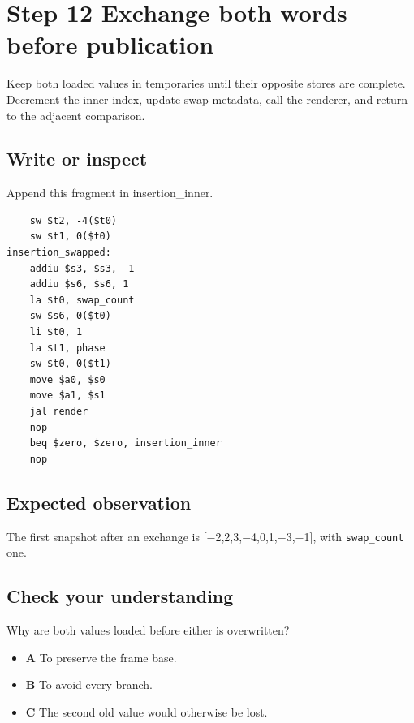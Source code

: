 \section{Step 12 Exchange both words before
  publication}\label{009-sorting-visualizer-s12-step-12-exchange-both-words-before-publication}

Keep both loaded values in temporaries until their opposite stores are
complete. Decrement the inner index, update swap metadata, call the
renderer, and return to the adjacent comparison.

\subsection{Write or
  inspect}\label{009-sorting-visualizer-s12-write-or-inspect}

Append this fragment in insertion\_inner.

\begin{verbatim}
    sw $t2, -4($t0)
    sw $t1, 0($t0)
insertion_swapped:
    addiu $s3, $s3, -1
    addiu $s6, $s6, 1
    la $t0, swap_count
    sw $s6, 0($t0)
    li $t0, 1
    la $t1, phase
    sw $t0, 0($t1)
    move $a0, $s0
    move $a1, $s1
    jal render
    nop
    beq $zero, $zero, insertion_inner
    nop
\end{verbatim}

\subsection{Expected
  observation}\label{009-sorting-visualizer-s12-expected-observation}

The first snapshot after an exchange is {[}\ensuremath{-}2,2,3,\ensuremath{-}4,0,1,\ensuremath{-}3,\ensuremath{-}1{]}, with
\texttt{swap\_count} one.

\subsection{Check your
  understanding}\label{009-sorting-visualizer-s12-check-your-understanding}

Why are both values loaded before either is overwritten?

\begin{itemize}
  \tightlist
  \item
        \textbf{A} To preserve the frame base.
  \item
        \textbf{B} To avoid every branch.
  \item
        \textbf{C} The second old value would otherwise be lost.
\end{itemize}
